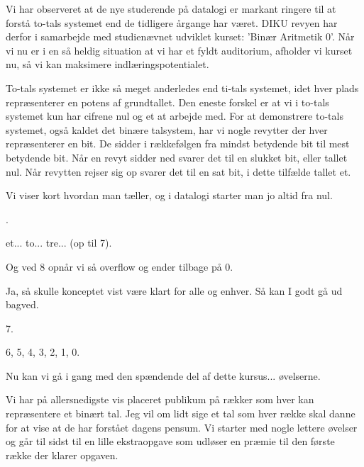 \documentclass[a4paper,11pt]{article}
\begin{document}
  
\begin{sketch}


 Vi har observeret at de nye studerende på datalogi er markant ringere 
til at forstå to-tals systemet end de tidligere årgange har været. DIKU revyen har 
derfor i samarbejde med studienævnet udviklet kurset: 'Binær Aritmetik 
0'. Når vi nu er i en så heldig situation at vi har et fyldt auditorium, 
afholder vi kurset nu, så vi kan maksimere indlæringspotentialet. 

 To-tals systemet er ikke så meget anderledes end ti-tals systemet, 
idet hver plads repræsenterer en potens af grundtallet. Den eneste 
forskel er at vi i to-tals systemet kun har cifrene nul og et at arbejde 
med. For at demonstrere to-tals systemet, også kaldet det binære 
talsystem, har vi nogle revytter der hver repræsenterer en bit. De 
sidder i rækkefølgen fra mindst betydende bit  
til mest betydende  bit. Når en revyt sidder ned 
svarer det til en slukket bit, eller tallet nul. Når revytten rejser sig 
op  svarer det til en sat bit, i dette tilfælde 
tallet et. 

 Vi viser kort hvordan man tæller, og i datalogi starter man jo altid 
fra nul.

.

 et... to... tre... (op til 7).

 Og ved 8 opnår vi så overflow og ender tilbage på 0.

 Ja, så skulle konceptet vist være klart for alle og
enhver.  Så kan I godt gå ud bagved.


 7. 

 6, 5, 4, 3, 2, 1, 0. 


 Nu kan vi gå i gang med den spændende del af dette kursus... øvelserne. 

 Vi har på allersnedigste vis placeret publikum på rækker som hver kan 
repræsentere et binært tal. Jeg vil om lidt sige et tal som hver række 
skal danne for at vise at de har forstået dagens pensum. Vi starter med 
nogle lettere øvelser og går til sidst til en lille ekstraopgave som 
udløser en præmie til den første række der klarer opgaven. 


\end{sketch}
\end{document}
